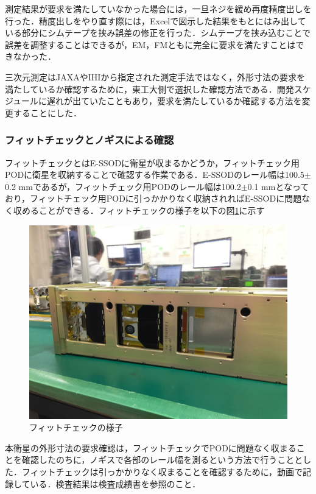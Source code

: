 測定結果が要求を満たしていなかった場合には，一旦ネジを緩め再度精度出しを行った．精度出しをやり直す際には，Excelで図示した結果をもとにはみ出している部分にシムテープを挟み誤差の修正を行った．シムテープを挟み込むことで誤差を調整することはできるが，EM，FMともに完全に要求を満たすことはできなかった．

三次元測定はJAXAやIHIから指定された測定手法ではなく，外形寸法の要求を満たしているか確認するために，東工大側で選択した確認方法である．開発スケジュールに遅れが出ていたこともあり，要求を満たしているか確認する方法を変更することにした．

\subsubsection{フィットチェックとノギスによる確認}

フィットチェックとはE-SSODに衛星が収まるかどうか，フィットチェック用PODに衛星を収納することで確認する作業である．E-SSODのレール幅は100.5$\pm$0.2 mmであるが，フィットチェック用PODのレール幅は100.2$\pm$0.1 mmとなっており，フィットチェック用PODに引っかかりなく収納されればE-SSODに問題なく収めることができる．フィットチェックの様子を以下の図\ref{fig:fitcheck}に示す

\begin{figure}[h]
	\begin{center}
		
		\includegraphics[width=0.6\linewidth]{04/fig/fitcheck.JPG}
		\caption{フィットチェックの様子}
		\label{fig:fitcheck}
		
	\end{center}
\end{figure}

本衛星の外形寸法の要求確認は，フィットチェックでPODに問題なく収まることを確認したのちに，ノギスで各部のレール幅を測るという方法で行うこととした．フィットチェックは引っかかりなく収まることを確認するために，動画で記録している．検査結果は検査成績書を参照のこと．


